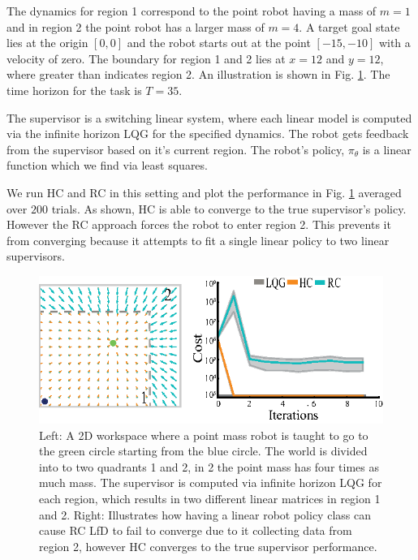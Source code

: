 \documentclass[10pt, conference]{ieeeconf}      %
\begin{document}
The dynamics for region 1 correspond to the point robot having a mass of $m=1$ and in region 2 the point robot has a larger mass of $m=4$. A target goal state lies at the origin $[0,0]$ and the robot starts out at the point $[-15,-10]$ with a velocity of zero. The boundary for region 1 and 2 lies at $x=12$ and $y=12$, where greater than indicates region 2. An illustration is shown in Fig. \ref{fig:p_mass}. The time horizon for the task is $T=35$. 

The supervisor is a switching linear system, where each linear model is computed via the infinite horizon LQG for the specified dynamics. The robot gets feedback from the supervisor based on it's current region. The robot's policy, $\pi_{\theta}$ is a linear function which we find via least squares. 

We run HC and RC in this setting and plot the performance in Fig. \ref{fig:p_mass} averaged over $200$ trials.  As shown, HC is able to converge to the true supervisor's policy.
However the RC approach forces the robot to enter region 2.
This prevents it from converging because it attempts to fit a single linear policy to two linear supervisors.

\begin{figure}
\centering
\includegraphics{f_figs/p_mass.eps}
\caption{
    \footnotesize
Left: A 2D workspace where a point mass robot is taught to go to the green circle starting from the blue circle. The world is divided into to two quadrants 1 and 2, in 2 the point mass has four times as much mass. The supervisor is computed via infinite horizon LQG for each region, which results in two different linear matrices in region 1 and 2. Right: Illustrates how having a linear robot policy class can cause RC LfD to fail  to converge due to it collecting data from region 2, however HC converges to the true supervisor performance. }
\vspace*{-1pt}
\label{fig:p_mass}
\end{figure}
\end{document}
